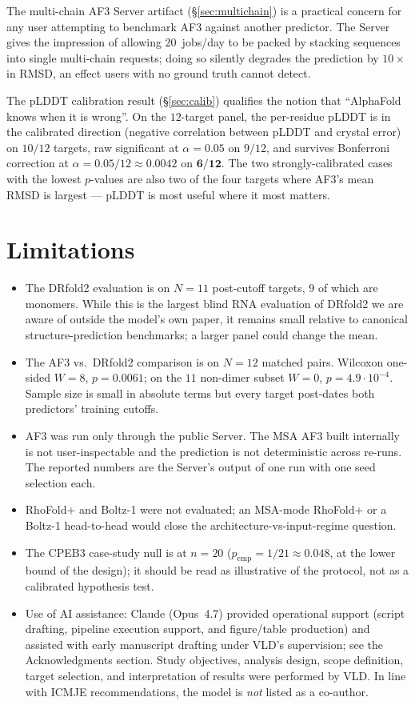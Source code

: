 \documentclass[11pt,a4paper]{article}
\begin{document}
The multi-chain AF3 Server artifact (\S\ref{sec:multichain}) is a
practical concern for any user attempting to benchmark AF3 against
another predictor. The Server gives the impression of allowing
$20$~jobs/day to be packed by stacking sequences into single
multi-chain requests; doing so silently degrades the prediction by
$10\times$ in RMSD, an effect users with no ground truth cannot
detect.

The pLDDT calibration result (\S\ref{sec:calib}) qualifies the
notion that ``AlphaFold knows when it is wrong''. On the $12$-target
panel, the per-residue pLDDT is in the calibrated direction (negative
correlation between pLDDT and crystal error) on $10/12$ targets, raw
significant at $\alpha=0.05$ on $9/12$, and survives Bonferroni
correction at $\alpha=0.05/12 \approx 0.0042$ on $\mathbf{6/12}$. The
two strongly-calibrated cases with the lowest $p$-values are also two
of the four targets where AF3's mean RMSD is largest --- pLDDT is
most useful where it most matters.

\section{Limitations}

\begin{itemize}
\item The DRfold2 evaluation is on $N=11$ post-cutoff targets, $9$
of which are monomers. While this is the largest blind RNA evaluation
of DRfold2 we are aware of outside the model's own paper, it remains
small relative to canonical structure-prediction benchmarks; a
larger panel could change the mean.
\item The AF3 vs.~DRfold2 comparison is on $N=12$ matched pairs.
Wilcoxon one-sided $W=8$, $p=0.0061$; on the $11$ non-dimer subset
$W=0$, $p=4.9\!\cdot\!10^{-4}$. Sample size is small in absolute
terms but every target post-dates both predictors' training
cutoffs.
\item AF3 was run only through the public Server. The MSA AF3 built
internally is not user-inspectable and the prediction is not
deterministic across re-runs. The reported numbers are the Server's
output of one run with one seed selection each.
\item RhoFold+ and Boltz-1 were not evaluated; an MSA-mode RhoFold+
or a Boltz-1 head-to-head would close the architecture-vs-input-regime
question.
\item The CPEB3 case-study null is at $n=20$ ($p_{\mathrm{emp}} =
1/21 \approx 0.048$, at the lower bound of the design); it should
be read as illustrative of the protocol, not as a calibrated
hypothesis test.
\item Use of AI assistance: Claude (Opus~4.7) provided operational
support (script drafting, pipeline execution support, and figure/table
production) and assisted with early manuscript drafting under VLD's
supervision; see the Acknowledgments section. Study objectives,
analysis design, scope definition, target selection, and interpretation
of results were performed by VLD. In line with ICMJE recommendations,
the model is \emph{not} listed as a co-author.
\end{itemize}
\end{document}
